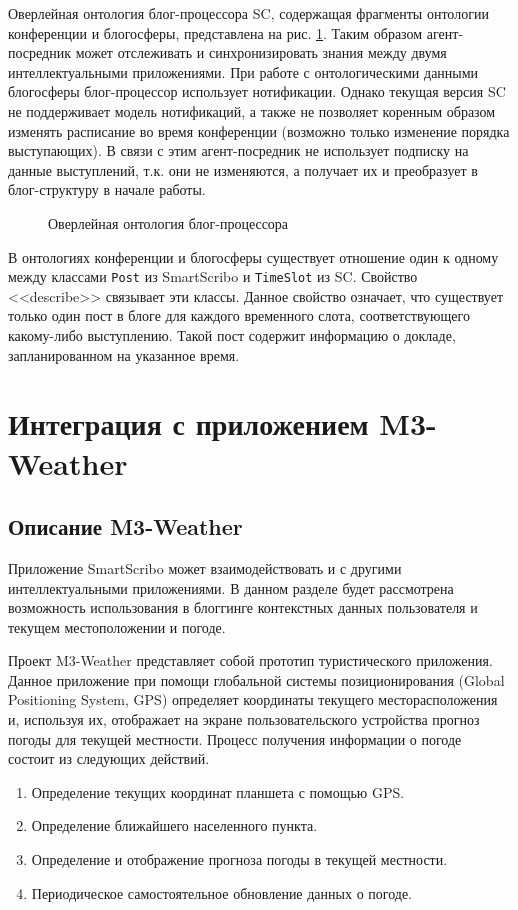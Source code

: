 Оверлейная онтология блог-процессора SC, содержащая фрагменты онтологии конференции и блогосферы, представлена на рис. \ref{bp-ontology}. Таким образом агент-посредник может отслеживать и синхронизировать знания между двумя интеллектуальными приложениями. При работе с онтологическими данными блогосферы блог-процессор использует нотификации. Однако текущая версия SC не поддерживает модель нотификаций, а также не позволяет коренным образом изменять расписание во время конференции (возможно только изменение порядка выступающих). В связи с этим агент-посредник не использует подписку на данные выступлений, т.к. они не изменяются, а получает их и преобразует в блог-структуру в начале работы.

\begin{figure}[h]
\centerline{
}
\caption{Оверлейная онтология блог-процессора}
\label{bp-ontology}
\end{figure}

В онтологиях конференции и блогосферы существует отношение один к одному между классами {\tt Post} из SmartScribo и {\tt TimeSlot} из SC. Свойство <<describe>> связывает эти классы. Данное свойство означает, что существует только один пост в блоге для каждого временного слота, соответствующего какому-либо выступлению. Такой пост содержит информацию о докладе, запланированном на указанное время.


\section{Интеграция с приложением M3-Weather}
\subsection*{Описание M3-Weather}
Приложение SmartScribo может взаимодействовать и с другими интеллектуальными приложениями. В данном разделе будет рассмотрена возможность использования в блоггинге контекстных данных пользователя и текущем местоположении и погоде.

Проект M3-Weather \cite{m3weather} представляет собой прототип туристического приложения.
Данное приложение при помощи глобальной системы позиционирования (Global
Positioning System, GPS) определяет координаты текущего месторасположения и,
используя их, отображает на экране пользовательского устройства прогноз погоды
для текущей местности. Процесс получения информации о погоде состоит из следующих действий.
\begin{enumerate}
\item
Определение текущих координат планшета с помощью GPS.
\item
Определение ближайшего населенного пункта.
\item
Определение и отображение прогноза погоды в текущей местности.
\item
Периодическое самостоятельное обновление данных о погоде.
\end{enumerate}

